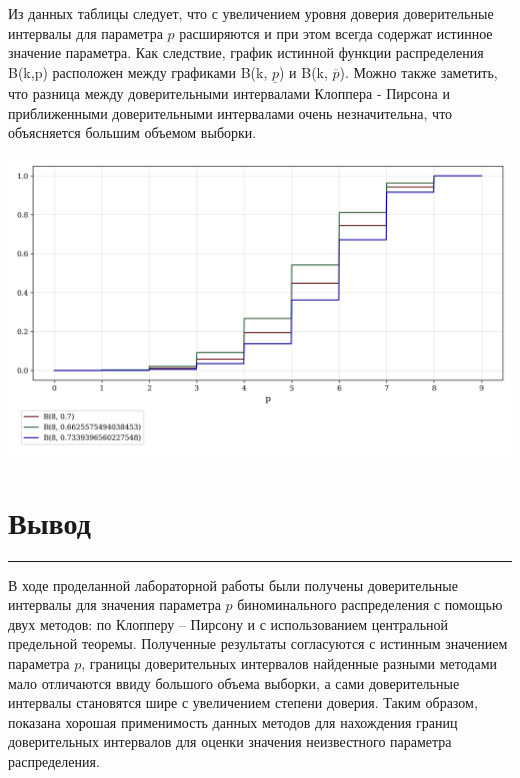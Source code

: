 \documentclass[a4paper, 14pt]{extarticle}
\begin{document}
\vspace{10pt}

Из  данных  таблицы  следует,  что  с  увеличением  уровня  доверия  доверительные  интервалы  для  
параметра  $p$  расширяются и  при  этом  всегда  содержат  истинное  значение  параметра.  Как 
следствие, график истинной функции распределения B(k,p) расположен между графиками B(k, $\underline{p}$) и 
B(k, $\overline{p}$). Можно также заметить, что разница между доверительными интервалами 
Клоппера - Пирсона и приближенными доверительными интервалами очень незначительна,  что  объясняется  
большим  объемом выборки.

\begin{center}
    \includegraphics[width=1\textwidth]{B_step}
\end{center}

\section*{Вывод}\vspace{-20pt}\rule{\linewidth}{0.1mm}

В ходе проделанной лабораторной работы были получены доверительные интервалы для значения 
параметра $p$ биноминального распределения с помощью двух методов: по Клопперу – Пирсону и с 
использованием центральной предельной теоремы. Полученные результаты согласуются с истинным 
значением параметра $p$, границы доверительных интервалов найденные разными методами мало отличаются 
ввиду большого объема выборки, а сами доверительные интервалы становятся шире с увеличением степени 
доверия. Таким образом, показана хорошая применимость данных методов для нахождения границ доверительных 
интервалов для оценки значения неизвестного параметра распределения.
\end{document}
